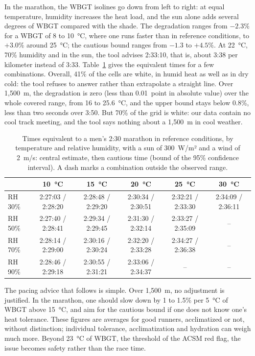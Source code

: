 \documentclass[11pt,a4paper]{article}
\begin{document}
In the marathon, the WBGT isolines go down from left to right: at equal temperature, humidity increases the heat load,
and the sun alone adds several degrees of WBGT compared with the shade. The degradation ranges from $-2.3$\% for a WBGT
of 8 to 10~°C, where one runs faster than in reference conditions, to $+3.0$\% around 25~°C; the cautious bound ranges
from $-1.3$ to $+4.5$\%. At 22~°C, 70\% humidity and in the sun, the tool advises 2:33:10, that is, about 3:38 per
kilometer instead of 3:33. Table~\ref{tab:chart} gives the equivalent times for a few combinations. Overall, 41\% of the
cells are white, in humid heat as well as in dry cold: the tool refuses to answer rather than extrapolate a straight
line. Over 1,500~m, the degradation is zero (less than 0.01~point in absolute value) over the whole covered range, from
16 to 25.6~°C, and the upper bound stays below 0.8\%, less than two seconds over 3:50. But 70\% of the grid is white:
our data contain no cool track meeting, and the tool says nothing about a 1,500~m in cool weather.

\begin{table}[htbp]
\centering
\small
\caption{Times equivalent to a men's 2:30 marathon in reference conditions, by temperature and relative humidity, with
a sun of 300~W/m² and a wind of 2~m/s: central estimate, then cautious time (bound of the 95\% confidence interval). A
dash marks a combination outside the observed range.}
\label{tab:chart}
\begin{tabular}{@{}lccccc@{}}
\toprule
& 10~°C & 15~°C & 20~°C & 25~°C & 30~°C \\
\midrule
RH 30\% & 2:27:03 / 2:28:20 & 2:28:48 / 2:29:20 & 2:30:34 / 2:30:51 & 2:32:21 / 2:33:30 & 2:34:09 / 2:36:11 \\
RH 50\% & 2:27:40 / 2:28:41 & 2:29:34 / 2:29:45 & 2:31:30 / 2:32:14 & 2:33:27 / 2:35:09 & -- \\
RH 70\% & 2:28:14 / 2:29:00 & 2:30:16 / 2:30:24 & 2:32:20 / 2:33:28 & 2:34:27 / 2:36:38 & -- \\
RH 90\% & 2:28:46 / 2:29:18 & 2:30:55 / 2:31:21 & 2:33:06 / 2:34:37 & -- & -- \\
\bottomrule
\end{tabular}
\end{table}

The pacing advice that follows is simple. Over 1,500~m, no adjustment is justified. In the marathon, one should slow
down by 1 to 1.5\% per 5~°C of WBGT above 15~°C, and aim for the cautious bound if one does not know one's heat
tolerance. These figures are averages for good runners, acclimatized or not, without distinction; individual
tolerance, acclimatization and hydration can weigh much more. Beyond 23~°C of WBGT, the threshold of the ACSM red flag,
the issue becomes safety rather than the race time.
\end{document}
